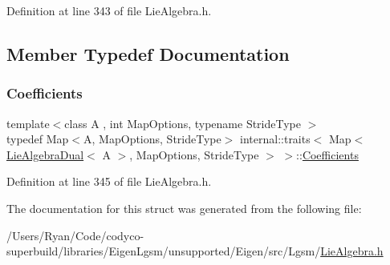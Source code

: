 Definition at line 343 of file Lie\+Algebra.\+h.



\subsection{Member Typedef Documentation}
\hypertarget{structinternal_1_1traits_3_01_map_3_01_lie_algebra_dual_3_01_a_01_4_00_01_map_options_00_01_stride_type_01_4_01_4_ac32d899dac63614bee761abd9fd3241d}{}\label{structinternal_1_1traits_3_01_map_3_01_lie_algebra_dual_3_01_a_01_4_00_01_map_options_00_01_stride_type_01_4_01_4_ac32d899dac63614bee761abd9fd3241d} 
\subsubsection{\texorpdfstring{Coefficients}{Coefficients}}
{\footnotesize\ttfamily template$<$class A , int Map\+Options, typename Stride\+Type $>$ \\
typedef Map$<$A, Map\+Options, Stride\+Type$>$ internal\+::traits$<$ Map$<$ \hyperlink{class_lie_algebra_dual}{Lie\+Algebra\+Dual}$<$ A $>$, Map\+Options, Stride\+Type $>$ $>$\+::\hyperlink{structinternal_1_1traits_3_01_map_3_01_lie_algebra_dual_3_01_a_01_4_00_01_map_options_00_01_stride_type_01_4_01_4_ac32d899dac63614bee761abd9fd3241d}{Coefficients}}



Definition at line 345 of file Lie\+Algebra.\+h.



The documentation for this struct was generated from the following file\+:\begin{DoxyCompactItemize}
\item 
/\+Users/\+Ryan/\+Code/codyco-\/superbuild/libraries/\+Eigen\+Lgsm/unsupported/\+Eigen/src/\+Lgsm/\hyperlink{_lie_algebra_8h}{Lie\+Algebra.\+h}\end{DoxyCompactItemize}
